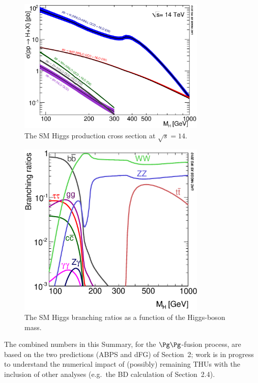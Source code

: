 \begin{figure}[p]
	\begin{center}
	\includegraphics[width=0.8\textwidth]{YRHXS_Summary/YRHXS_Summary_fig3.eps}
	\caption{The SM Higgs production cross section at $\sqrt{s} = 14$\UTeV.}
	\label{fig:SMXS14TeV}
	\end{center}
\end{figure}

\begin{figure}[!h]
	\begin{center}
	\includegraphics[width=0.8\textwidth]{YRHXS_BR/YRHXS_BR_fig3.eps}
	\caption{The SM Higgs branching ratios as a function of the Higgs-boson
              mass.}
	\label{fig:SMBRs}
	\end{center}
\end{figure}

The combined numbers in this Summary, for the $\Pg\Pg$-fusion process,
are based on the two predictions (ABPS and dFG) of Section~2; work is in
progress to understand the numerical impact of (possibly) remaining THUs with
the inclusion of other analyses (e.g.\ the BD calculation of Section~2.4).

